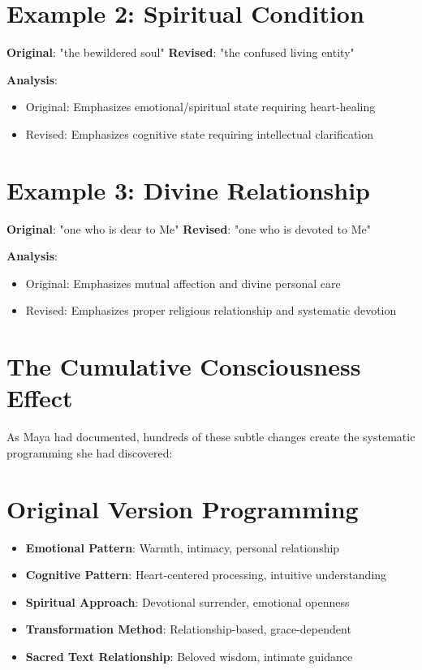 \documentclass[11pt,twoside]{book}
\begin{document}
\section*{Example 2: Spiritual Condition}
\label{sec:org172bb29}
\textbf{\textbf{Original}}: "the bewildered soul"  
\textbf{\textbf{Revised}}: "the confused living entity"

\newpage
\textbf{\textbf{Analysis}}:
\begin{itemize}
\item Original: Emphasizes emotional/spiritual state requiring heart-healing
\item Revised: Emphasizes cognitive state requiring intellectual clarification
\end{itemize}
\section*{Example 3: Divine Relationship}
\label{sec:org4b58420}
\textbf{\textbf{Original}}: "one who is dear to Me"
\textbf{\textbf{Revised}}: "one who is devoted to Me"

\textbf{\textbf{Analysis}}:
\begin{itemize}
\item Original: Emphasizes mutual affection and divine personal care
\item Revised: Emphasizes proper religious relationship and systematic devotion
\end{itemize}
\section*{The Cumulative Consciousness Effect}
\label{sec:org06ebc1c}

As Maya had documented, hundreds of these subtle changes create the systematic programming she had discovered:
\section*{Original Version Programming}
\label{sec:orgbe23577}
\begin{itemize}
\item \textbf{\textbf{Emotional Pattern}}: Warmth, intimacy, personal relationship
\item \textbf{\textbf{Cognitive Pattern}}: Heart-centered processing, intuitive understanding
\item \textbf{\textbf{Spiritual Approach}}: Devotional surrender, emotional openness
\item \textbf{\textbf{Transformation Method}}: Relationship-based, grace-dependent
\item \textbf{\textbf{Sacred Text Relationship}}: Beloved wisdom, intimate guidance
\end{itemize}
\end{document}
